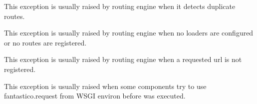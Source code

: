 \documentclass[letterpaper,10pt,english]{sphinxmanual}
\begin{document}

\begin{fulllineitems}
\label{features/exceptions:fantastico.exceptions.FantasticoDuplicateRouteError}
This exception is usually raised by routing engine when it detects duplicate routes.

\end{fulllineitems}


\begin{fulllineitems}
\label{features/exceptions:fantastico.exceptions.FantasticoNoRoutesError}
This exception is usually raised by routing engine when no loaders are configured or no routes are registered.

\end{fulllineitems}


\begin{fulllineitems}
\label{features/exceptions:fantastico.exceptions.FantasticoRouteNotFoundError}
This exception is usually raised by routing engine when a requested url is not registered.

\end{fulllineitems}


\begin{fulllineitems}
\label{features/exceptions:fantastico.exceptions.FantasticoNoRequestError}
This exception is usually raised when some components try to use fantastico.request from WSGI environ before 
{\hyperref[features/request_response:fantastico.middleware.request_middleware.RequestMiddleware]{}} was executed.

\end{fulllineitems}

\end{document}
